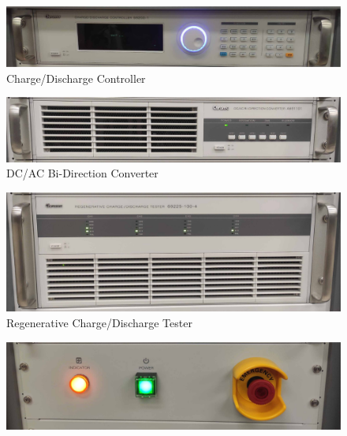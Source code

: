 \begin{center}
	\begin{figure}[H]
		\includegraphics[width=1\linewidth]{Chapters/img/Charge_Discharge_Controller.jpg}
			\centering
			\captionsetup{justification=centering,margin=2cm}
			\caption{Charge/Discharge Controller}
	\end{figure}
	\begin{figure}[H]
		\includegraphics[width=1\linewidth]{Chapters/img/Bi_Direction_Converter.jpg}
			\centering
			\captionsetup{justification=centering,margin=2cm}
			\caption{DC/AC Bi-Direction Converter}
	\end{figure}
	\begin{figure}[H]
		\includegraphics[width=1\linewidth]{Chapters/img/Regenerative_Charge_Discharge.jpg}
			\centering
			\captionsetup{justification=centering,margin=2cm}
			\caption{Regenerative Charge/Discharge Tester}
	\end{figure}
	\begin{figure}[H]
		\includegraphics[width=1\linewidth]{Chapters/img/ON_OFF_Controller.jpg}
			\centering
			\captionsetup{justification=centering,margin=2cm}

\end{figure}
\end{center}
